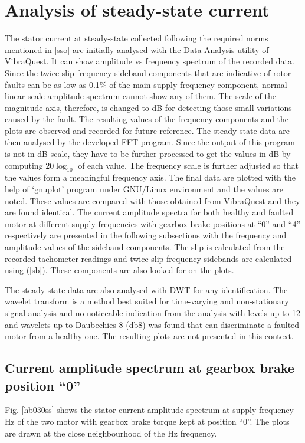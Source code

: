\documentclass[a4paper,11pt]{report}
\begin{document}
\section{Analysis of steady-state current}
The stator current at steady-state collected following the required norms mentioned in \ref{sso} are initially analysed with the Data Analysis utility of VibraQuest. It can show amplitude vs frequency spectrum of the recorded data. Since the twice slip frequency sideband components that are indicative of rotor faults can be as low as 0.1\% of the main supply frequency component, normal linear scale amplitude spectrum cannot show any of them. The scale of the magnitude axis, therefore, is changed to dB for detecting those small variations caused by the fault. The resulting values of the frequency components and the plots are observed and recorded for future reference. The steady-state data are then analysed by the developed FFT program. Since the output of this program is not in dB scale, they have to be further processed to get the values in dB by computing $20\log_{10}$ of each value. The frequency scale is further adjusted so that the values form a meaningful frequency axis. The final data are plotted with the help of `gnuplot' program under GNU/Linux environment and the values are noted. These values are compared with those obtained from VibraQuest and they are found identical. The current amplitude spectra for both healthy and faulted motor at different supply frequencies with gearbox brake positions at ``0'' and ``4'' respectively are presented in the following subsections with the frequency and amplitude values of the sideband components. The slip is calculated from the recorded tachometer readings and twice slip frequency sidebands are calculated using (\ref{sb}). These components are also looked for on the plots.

The steady-state data are also analysed with DWT for any identification. The wavelet transform is a method best suited for time-varying and non-stationary signal analysis and no noticeable indication from the analysis with levels up to 12 and wavelets up to Daubechies 8 (db8) was found that can discriminate a faulted motor from a healthy one. The resulting plots are not presented in this context.

\clearpage
\subsection{Current amplitude spectrum at gearbox brake position ``0''}
Fig. \ref{hb030ss} shows the stator current amplitude spectrum at supply frequency \unit[30]{Hz} of the two motor with gearbox brake torque kept at position ``0''. The plots are drawn at the close neighbourhood of the \unit[30]{Hz} frequency.
\end{document}
